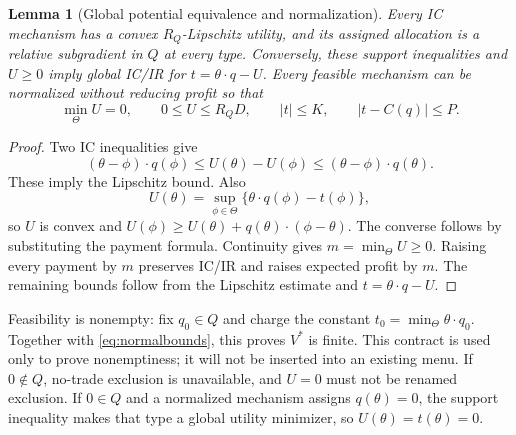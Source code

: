 \documentclass[11pt,a4paper]{article}
\numberwithin{equation}{section}
\newtheorem{lemma}[theorem]{Lemma}
\begin{document}
\begin{lemma}[Global potential equivalence and normalization]\label{lem:normal}
Every IC mechanism has a convex \(R_Q\)-Lipschitz utility, and its
assigned allocation is a relative subgradient in \(Q\) at every type.
Conversely, these support inequalities and \(U\ge0\) imply global
IC/IR for \(t=\theta\cdot q-U\).
Every feasible mechanism can be normalized without reducing profit so that
\begin{equation}\label{eq:normalbounds}
 \min_\Theta U=0,\qquad
 0\le U\le R_QD,\qquad |t|\le K,\qquad |t-C(q)|\le P.
\end{equation}
\end{lemma}
\begin{proof}
Two IC inequalities give
\[
 (\theta-\phi)\cdot q(\phi)
 \le U(\theta)-U(\phi)
 \le(\theta-\phi)\cdot q(\theta).
\]
These imply the Lipschitz bound. Also
\[
 U(\theta)=\sup_{\phi\in\Theta}\{\theta\cdot q(\phi)-t(\phi)\},
\]
so \(U\) is convex and
\(U(\phi)\ge U(\theta)+q(\theta)\cdot(\phi-\theta)\).
The converse follows by substituting the payment formula.
Continuity gives \(m=\min_\Theta U\ge0\). Raising every payment by
\(m\) preserves IC/IR and raises expected profit by \(m\).
The remaining bounds follow from the Lipschitz estimate and
\(t=\theta\cdot q-U\).
\end{proof}

Feasibility is nonempty: fix \(q_0\in Q\) and charge the constant
\(t_0=\min_\Theta\theta\cdot q_0\).
Together with \eqref{eq:normalbounds}, this proves \(V^*\) is finite.
This contract is used only to prove nonemptiness; it will not be inserted
into an existing menu.
If \(0\notin Q\), no-trade exclusion is unavailable, and \(U=0\) must
not be renamed exclusion. If \(0\in Q\) and a normalized mechanism assigns
\(q(\theta)=0\), the support inequality makes that type a global utility
minimizer, so \(U(\theta)=t(\theta)=0\).
\end{document}
